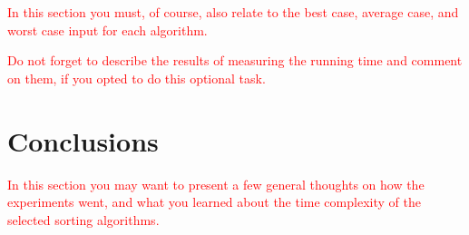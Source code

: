 \documentclass{scrartcl}
\begin{document}
\textcolor{red}{In this section you must, of course, also relate to the best case, average case, and worst case input for each algorithm.}

\textcolor{red}{Do not forget to describe the results of measuring the running time and comment on them, if you opted to do this optional task.}

\lipsum[1-2]

\section{Conclusions}
\label{sec:conclusions}

\textcolor{red}{In this section you may want to present a few general thoughts on how the experiments went, and what you learned about the time complexity of the selected sorting algorithms.}

\lipsum[1]



\end{document}
